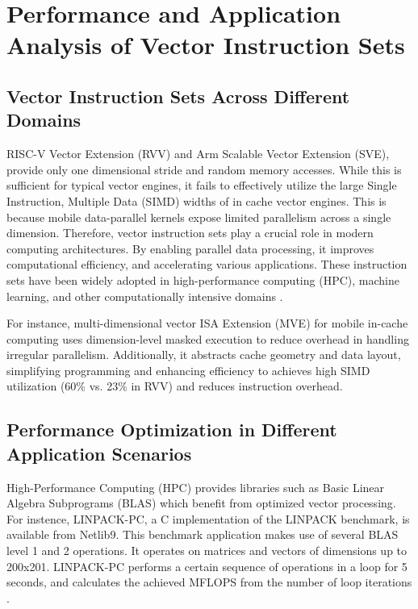 \documentclass[conference]{IEEEtran}
\begin{document}
\section{Performance and Application Analysis of Vector Instruction Sets}

\subsection{Vector Instruction Sets Across Different Domains}

RISC-V Vector Extension (RVV) and Arm Scalable Vector Extension (SVE), provide only one dimensional stride and random memory accesses. While this is sufficient for typical vector engines, it fails to effectively utilize the large Single Instruction, Multiple Data (SIMD) widths of in cache vector engines. This is because mobile data-parallel kernels expose limited parallelism across a single dimension. Therefore, vector instruction sets play a crucial role in modern computing architectures. By enabling parallel data processing, it improves computational efficiency, and accelerating various applications. These instruction sets have been widely adopted in high-performance computing (HPC), machine learning, and other computationally intensive domains \cite{b18}. 

For instance, multi-dimensional vector ISA Extension (MVE) for mobile in-cache computing uses dimension-level masked execution to reduce overhead in handling irregular parallelism. Additionally, it abstracts cache geometry and data layout, simplifying programming and enhancing efficiency to achieves high SIMD utilization (60\% vs. 23\% in RVV) and reduces instruction overhead.

\subsection{Performance Optimization in Different Application Scenarios}

High-Performance Computing (HPC) provides libraries such as Basic Linear Algebra Subprograms (BLAS) which benefit from optimized vector processing. For instence, LINPACK-PC, a C implementation of the LINPACK benchmark, is available from Netlib9. This benchmark application makes use of several BLAS level 1 and 2 operations. It operates on matrices and vectors of dimensions up to 200x201. LINPACK-PC performs a certain sequence of operations in a loop for 5 seconds, and calculates the achieved MFLOPS from
the number of loop iterations \cite{b19}. 
\end{document}
